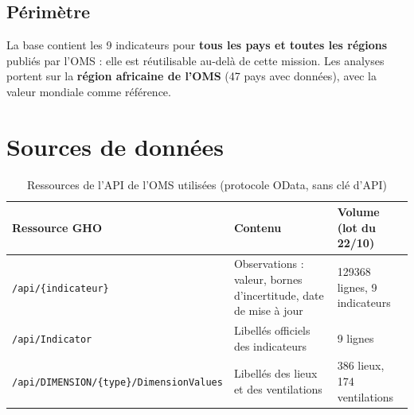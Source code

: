 \documentclass[11pt, a4paper, oneside, headings=normal, numbers=noenddot, DIV=12]{scrartcl}
\begin{document}
\subsection{Périmètre}
La base contient les 9 indicateurs pour \textbf{tous les pays et toutes les régions} publiés par l'OMS : elle est réutilisable au-delà de
cette mission. Les analyses portent sur la \textbf{région africaine de l'OMS} (47 pays avec données), avec la valeur mondiale comme référence.

\section{Sources de données}

\begin{table}[H]
\centering\small
\begin{tabularx}{\linewidth}{@{}L{3.4cm} Y L{3.6cm}@{}}
\toprule
\textbf{Ressource GHO} & \textbf{Contenu} & \textbf{Volume (lot du 22/10)} \\
\midrule
\texttt{/api/\{indicateur\}} & Observations : valeur, bornes d'incertitude, date de mise à jour & \num{129368} lignes, 9 indicateurs \\
\texttt{/api/Indicator} & Libellés officiels des indicateurs & 9 lignes \\
\texttt{/api/DIMENSION/}\allowbreak\texttt{\{type\}/}\allowbreak\texttt{DimensionValues} & Libellés des lieux et des ventilations & 386 lieux, 174 ventilations \\
\bottomrule
\end{tabularx}
\caption{Ressources de l'API de l'OMS utilisées (protocole OData, sans clé d'API)}
\end{table}
\end{document}
